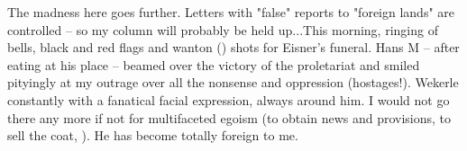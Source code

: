 
The madness here goes further. Letters with "false" reports to "foreign lands" are controlled -- so my column will probably be held up...This morning, ringing of bells, black and red flags and wanton () shots for Eisner's funeral. Hans M -- after eating at his place -- beamed over the victory of the proletariat and smiled pityingly at my outrage over all the nonsense and oppression (hostages!). Wekerle constantly with a fanatical facial expression, always around him. I would not go there any more if not for multifaceted egoism (to obtain news and provisions, to sell the coat, ). He has become totally foreign to me.

\missing

